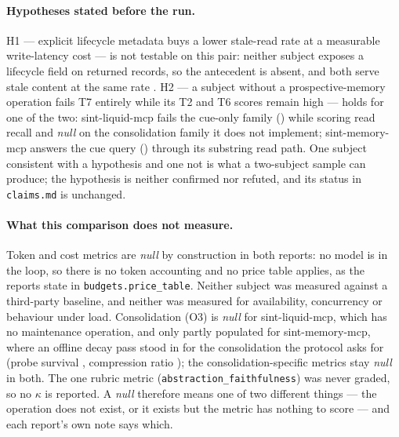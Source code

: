 \documentclass[11pt,a4paper]{article}
\begin{document}
\paragraph{Hypotheses stated before the run.} H1 --- explicit lifecycle metadata buys a lower
stale-read rate at a measurable write-latency cost --- is not testable on this pair: neither
subject exposes a lifecycle field on returned records, so the antecedent is absent, and both
serve stale content at the same rate . H2 --- a subject without a
prospective-memory operation fails T7 entirely while its T2 and T6 scores remain high --- holds
for one of the two: sint-liquid-mcp fails the cue-only family ()
while scoring read recall  and \textit{null} on the consolidation
family it does not implement; sint-memory-mcp answers the cue query
() through its substring read path. One subject consistent with a
hypothesis and one not is what a two-subject sample can produce; the hypothesis is neither
confirmed nor refuted, and its status in \texttt{claims.md} is unchanged.

\paragraph{What this comparison does not measure.} Token and cost metrics are \textit{null} by
construction in both reports: no model is in the loop, so there is no token accounting and no
price table applies, as the reports state in \texttt{budgets.price\_table}. Neither subject was
measured against a third-party baseline, and neither was measured for availability, concurrency
or behaviour under load. Consolidation (O3) is \textit{null} for sint-liquid-mcp, which has no
maintenance operation, and only partly populated for sint-memory-mcp, where an offline decay
pass stood in for the consolidation the protocol asks for (probe survival
, compression ratio ); the
consolidation-specific metrics stay \textit{null} in both. The one rubric metric
(\texttt{abstraction\_faithfulness}) was never graded, so no $\kappa$ is reported. A
\textit{null} therefore means one of two different things --- the operation does not exist, or it
exists but the metric has nothing to score --- and each report's own note says which.




\end{document}
